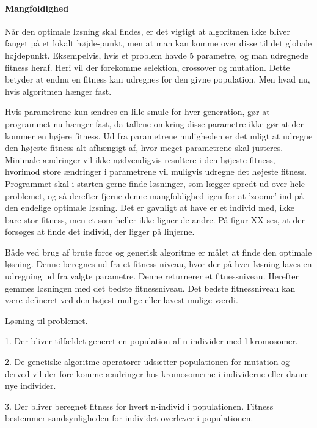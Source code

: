 \paragraph{Mangfoldighed}

Når den optimale løsning skal findes, er det vigtigt at algoritmen ikke bliver fanget på et lokalt højde-punkt, men at man kan komme over disse til det globale højdepunkt. Eksempelvis, hvis et problem havde 5 parametre, og man udregnede fitness heraf. Heri vil der forekomme selektion, crossover og mutation. Dette betyder at endnu en fitness kan udregnes for den givne population. Men hvad nu, hvis algoritmen hænger fast. 

Hvis parametrene kun ændres en lille smule for hver generation, gør at programmet nu hænger fast, da tallene omkring disse parametre ikke gør at der kommer en højere fitness. Ud fra parametrene muligheden er det mligt at udregne den højeste fitness alt afhængigt af, hvor meget parametrene skal justeres. Minimale ændringer vil ikke nødvendigvis resultere i den højeste fitness, hvorimod store ændringer i parametrene vil muligvis udregne det højeste fitness. Programmet skal i starten gerne finde løsninger, som lægger spredt ud over hele problemet, og så derefter fjerne denne mangfoldighed igen for at ’zoome’ ind på den endelige optimale løsning. 
Det er gavnligt at have er et individ med, ikke bare stor fitness, men et som heller ikke ligner de andre. På figur XX%
 ses, at der forsøges at finde det individ, der ligger på linjerne.

Både ved brug af brute force og generisk algoritme er målet at finde den optimale løsning. Denne beregnes ud fra et fitness niveau, hvor der på hver løsning laves en udregning ud fra valgte parametre. Denne returnerer et fitnessniveau. Herefter gemmes løsningen med det bedste fitnessniveau. Det bedste fitnessniveau kan være defineret ved den højest mulige eller lavest mulige værdi.

Løsning til problemet.

1.	Der bliver tilfældet generet en population af n-individer med l-kromosomer.


2.	De genetiske algoritme operatorer udsætter populationen for mutation og derved vil der fore-komme ændringer hos kromosomerne i individerne eller danne nye individer.


3.	Der bliver beregnet fitness for hvert n-individ i populationen. Fitness bestemmer sandsynligheden for individet overlever i populationen.


